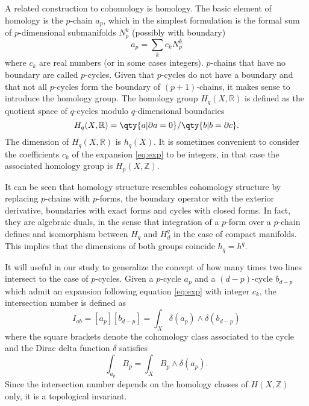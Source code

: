 A related construction to cohomology is homology.
The basic element of homology is the $p$-chain $a_p$, which in the simplest formulation is the
formal sum of $p$-dimensional submanifolds $N_p^k$ (possibly with boundary)
\begin{equation}
  a_p = \sum_k c_k N_p^k 
  \label{eq:exp}
\end{equation}
where $c_k$ are real numbers (or in some cases integers).
$p$-chains that have no boundary are called $p$-cycles.
Given that $p$-cycles do not have a boundary and that not all $p$-cycles form the boundary of $(p+1)$-chains, it makes sense to introduce the homology group.
The homology group $H_q(X,\mathbb R)$ is defined as the quotient space of $q$-cycles modulo $q$-dimensional
boundaries
\begin{equation}
  H_q(X,\mathbb R) =\qty{a| \partial a=0}/\qty{b|b=\partial c}.
\end{equation}
The dimension of $H_q(X,\mathbb R)$ is $h_q(X)$.
It is sometimes convenient to consider the coefficients $c_k$ of the expansion \eqref{eq:exp} to
be integers, in that case the associated homology group is $H_p(X,\mathbb Z)$.

It can be seen that homology structure resembles cohomology structure by replacing $p$-chains with $p$-forms, the boundary operator
with the exterior derivative, boundaries with exact forms and cycles with closed forms.
In fact, they are algebraic duals, in the sense that integration of a $p$-form over a $p$-chain
defines and isomorphism between $H_q$ and $H^q_d$ in the case of compact manifolds. 
This implies that the dimensions of both groups coincide $h_q=h^q$.

It will useful in our study to generalize the concept of how many times two lines intersect to the case of
$p$-cycles.
Given a $p$-cycle $a_p$ and a $(d-p)$-cycle $b_{d-p}$ which admit an expansion following equation \eqref{eq:exp} with integer $c_k$,
the intersection number is defined as
\begin{equation}
  I_{ab}=[a_p] [b_{d-p}] = \int_X \delta(a_p)\wedge \delta(b_{d-p})
\end{equation}
where the square brackets denote the cohomology class associated to the cycle and the Dirac delta function $\delta$ satisfies
\begin{equation}
  \int_{a_p} B_p = \int_X B_p \wedge \delta(a_p).
\end{equation}
Since the intersection number depends on the homology classes of $H(X,\mathbb Z)$ only, it is a topological invariant.

